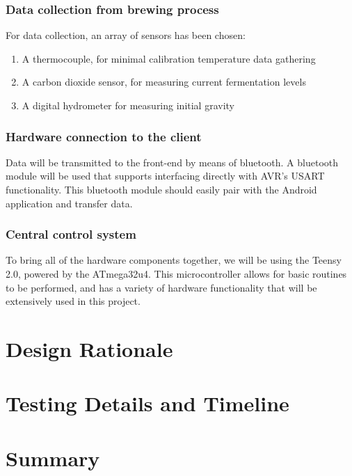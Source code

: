 \documentclass[draftclsnofoot,onecolumn,letterpaper,10pt]{IEEEtran}
\begin{document}
\subsubsection{Data collection from brewing process}
For data collection, an array of sensors has been chosen:
\begin{enumerate}
	\item A thermocouple, for minimal calibration temperature data gathering
	\item A carbon dioxide sensor, for measuring current fermentation levels
	\item A digital hydrometer for measuring initial gravity
\end{enumerate}
\subsubsection{Hardware connection to the client}
Data will be transmitted to the front-end by means of bluetooth. A bluetooth module will be used that supports interfacing directly with AVR's
USART functionality. This bluetooth module should easily pair with the Android application and transfer data.

\subsubsection{Central control system}
To bring all of the hardware components together, we will be using the Teensy 2.0, powered by the ATmega32u4. This microcontroller allows for basic
routines to be performed, and has a variety of hardware functionality that will be extensively used in this project.

\section{Design Rationale}

\section{Testing Details and Timeline}

\section{Summary}



\end{document}
